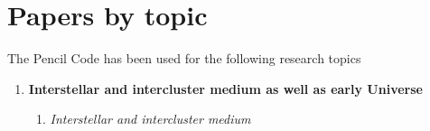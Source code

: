 \documentclass[12pt]{article}
\begin{document}
\section{Papers by topic}

The {\sc Pencil Code} has been used for the following research topics
\begin{enumerate}

\item
{\bf Interstellar and intercluster medium as well as early Universe}

\begin{enumerate}
\item
{\em Interstellar and intercluster medium} \citep{
2026A&A...711A.147S,%
2024GMS...283..179C,%
2024LRCA...10....3K,%
2024A&A...690A..77E,%
2023A&A...677A..46E,%
2023MNRAS.523.1056P,%
2023ApJ...943..176G,%
2022MNRAS.513.2136B,%
2022ApJ...926...94M,%
2021ApJ...910L..15G,%
2021A&A...648A..52L,%
2020ApJ...896...86C,%
2020ApJ...903..148L,%
2020MNRAS.496.4749B,%
2020ApJ...896L..14B,%
2020GApFD.114...77G,%
2019arXiv190808781E,%
2019MNRAS.488.5065E,%
}
\end{enumerate}
\end{enumerate}
\end{document}
